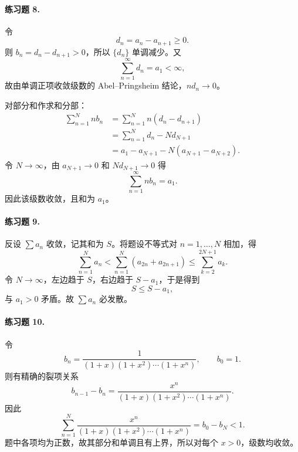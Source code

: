 \paragraph{练习题 8.}
\begin{xsolution}
令
\[
 d_n=a_n-a_{n+1}\geq0.
\]
则 $b_n=d_n-d_{n+1}>0$，所以 $\{d_n\}$ 单调减少。又
\[
 \sum_{n=1}^{\infty}d_n=a_1<\infty,
\]
故由单调正项收敛级数的 Abel--Pringsheim 结论，$nd_n\to0$。

对部分和作求和分部：
\[
 \begin{aligned}
 \sum_{n=1}^{N}nb_n
 &=\sum_{n=1}^{N}n(d_n-d_{n+1})\\
 &=\sum_{n=1}^{N}d_n-Nd_{N+1}\\
 &=a_1-a_{N+1}-N(a_{N+1}-a_{N+2}).
 \end{aligned}
\]
令 $N\to\infty$，由 $a_{N+1}\to0$ 和 $Nd_{N+1}\to0$ 得
\[
 \sum_{n=1}^{\infty}nb_n=a_1.
\]
因此该级数收敛，且和为 $a_1$。
\end{xsolution}

\paragraph{练习题 9.}
\begin{xsolution}
反设 $\sum a_n$ 收敛，记其和为 $S$。将题设不等式对 $n=1,\ldots,N$ 相加，得
\[
 \sum_{n=1}^{N}a_n
 <\sum_{n=1}^{N}(a_{2n}+a_{2n+1})
 \leq\sum_{k=2}^{2N+1}a_k.
\]
令 $N\to\infty$，左边趋于 $S$，右边趋于 $S-a_1$，于是得到
\[
 S\leq S-a_1,
\]
与 $a_1>0$ 矛盾。故 $\sum a_n$ 必发散。
\end{xsolution}

\paragraph{练习题 10.}
\begin{xsolution}
令
\[
 b_n=\frac1{(1+x)(1+x^2)\cdots(1+x^n)},
 \qquad b_0=1.
\]
则有精确的裂项关系
\[
 b_{n-1}-b_n
 =\frac{x^n}{(1+x)(1+x^2)\cdots(1+x^n)}.
\]
因此
\[
 \sum_{n=1}^{N}\frac{x^n}{(1+x)(1+x^2)\cdots(1+x^n)}
 =b_0-b_N<1.
\]
题中各项均为正数，故其部分和单调且有上界，所以对每个 $x>0$，级数均收敛。
\end{xsolution}

